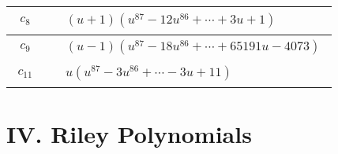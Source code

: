 \documentclass[1p]{elsarticle_modified}
\theoremstyle{definition}
\begin{document}
\begin{tabular}{m{50pt}|m{274pt}}
\hline $$\begin{aligned}c_{8}\end{aligned}$$&$\begin{aligned}
&(u+1)(u^{87}-12 u^{86}+\cdots+3 u+1)
\end{aligned}$\\
\hline $$\begin{aligned}c_{9}\end{aligned}$$&$\begin{aligned}
&(u-1)(u^{87}-18 u^{86}+\cdots+65191 u-4073)
\end{aligned}$\\
\hline $$\begin{aligned}c_{11}\end{aligned}$$&$\begin{aligned}
&u(u^{87}-3 u^{86}+\cdots-3 u+11)
\end{aligned}$\\
\hline
\end{tabular}\newpage\renewcommand{\arraystretch}{1}
\centering \section*{ IV. Riley Polynomials}
\end{document}
